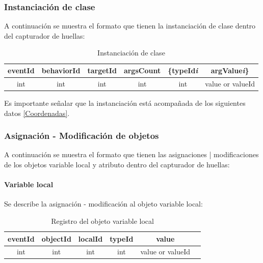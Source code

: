 \documentclass[12pt,legalpaper]{report}
\begin{document}
			\subsubsection{Instanciación de clase}

A continuación se muestra el formato que tienen la instanciación de clase dentro del capturador de huellas:\\

\begin{table}[!h]
\begin{center}
\begin{tabular}{| c | c | c | c | c | c |}
\hline
\rowcolor[gray]{0.9}eventId & behaviorId & targetId & argsCount & \{typeId\textit{{\scriptsize  i}} & argValue\textit{{\scriptsize  i}}\}\\
\hline
int & int & int & int & int & value or valueId\footnotemark[1]\\
\hline
\end{tabular}
\caption{Instanciación de clase} 
\end{center}
\end{table}

Es importante señalar que la instanciación está acompañada de los siguientes datos \ref{Coordenadas}.


			\subsubsection{Asignación - Modificación de objetos}
A continuación se muestra el formato que tienen las asignaciones | modificaciones de los objetos variable local y atributo dentro del capturador de huellas:\\

				\paragraph{Variable local}

Se describe la asignación - modificación al objeto variable local:\\

\begin{table}[!h]
\begin{center}
\begin{tabular}{| c | c | c | c | c | c |}
\hline
\rowcolor[gray]{0.9}eventId & objectId & localId & typeId & value\\
\hline
int & int & int & int & value or valueId\footnotemark[1]\\
\hline
\end{tabular}
\caption{Registro del objeto variable local} 
\end{center}
\end{table}
\end{document}
